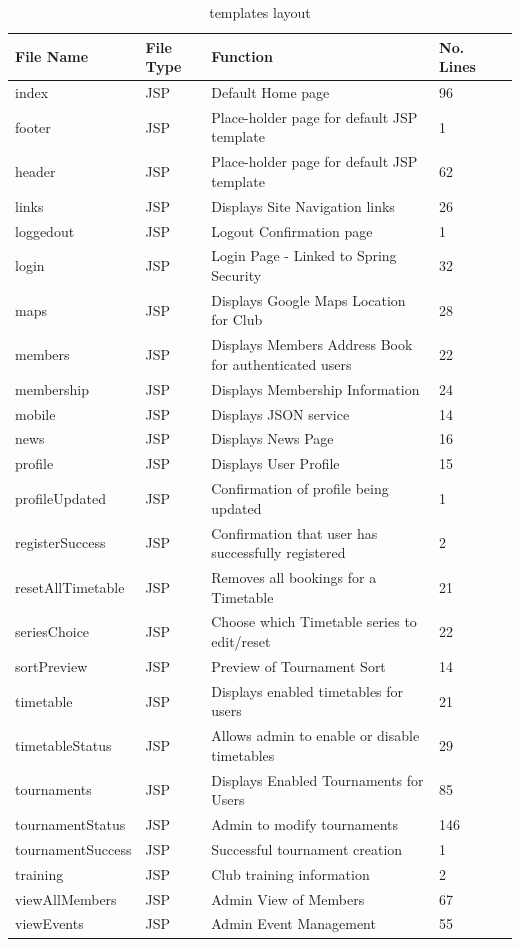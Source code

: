 \begin{table}[H]
\begin{center}
    \begin{tabular}{| l | l | l| l |p{1cm} |}
    \hline
    File Name & File Type & Function & No. Lines\\ \hline
	index & JSP & Default Home page & 96\\ \hline
	footer & JSP & Place-holder page for default JSP template & 1\\ \hline	
	header & JSP & Place-holder page for default JSP template & 62\\ \hline		
	links & JSP & Displays Site Navigation links & 26\\ \hline	
	loggedout & JSP & Logout Confirmation page & 1\\ \hline	
	login & JSP & Login Page - Linked to Spring Security & 32\\ \hline	
	maps & JSP & Displays Google Maps Location for Club & 28\\ \hline	
	members & JSP & Displays Members Address Book for authenticated users & 22\\ \hline	
	membership & JSP & Displays Membership Information & 24\\ \hline	
	mobile & JSP & Displays JSON service & 14\\ \hline
	news & JSP & Displays News Page & 16\\ \hline	
	profile & JSP & Displays User Profile & 15\\ \hline	
	profileUpdated & JSP & Confirmation of profile being updated & 1\\ \hline	
	registerSuccess & JSP & Confirmation that user has successfully registered & 2\\ \hline	
	resetAllTimetable & JSP & Removes all bookings for a Timetable & 21\\ \hline	
	seriesChoice & JSP & Choose which Timetable series to edit/reset & 22\\ \hline	
	sortPreview & JSP & Preview of Tournament Sort & 14\\ \hline	
	timetable & JSP & Displays enabled timetables for users & 21 \\ \hline	
	timetableStatus & JSP & Allows admin to enable or disable timetables & 29\\ \hline	
	tournaments & JSP & Displays Enabled Tournaments for Users & 85\\ \hline	
	tournamentStatus & JSP & Admin to modify tournaments & 146\\ \hline	
	tournamentSuccess & JSP & Successful tournament creation & 1\\ \hline	
	training & JSP & Club training information & 2\\ \hline
	viewAllMembers & JSP & Admin View of Members & 67\\ \hline	
	viewEvents & JSP & Admin Event Management & 55\\ \hline	
    \end{tabular}
\end{center}
\caption{templates layout}
\end{table}


